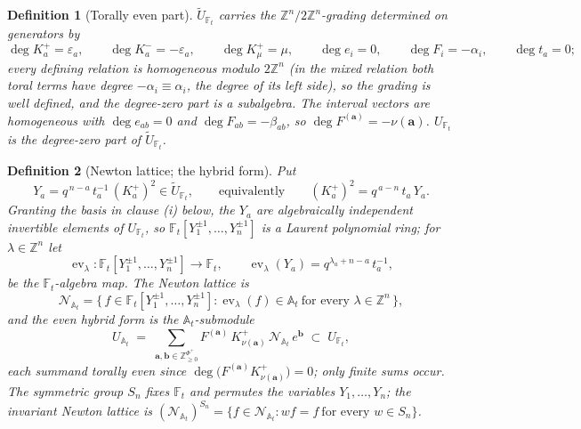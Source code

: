 \documentclass[11pt]{article}
\newtheorem{definition}{Definition}
\newcommand{\At}{\mathbb A_t}
\newcommand{\Ft}{\mathbb F_t}
\newcommand{\Nat}{\mathcal N_{\mathbb A_t}}
\newcommand{\ev}{\operatorname{ev}}
\begin{document}
\begin{definition}[Torally even part]\label{def:even}
$\widetilde U_{\Ft}$ carries the $\mathbb Z^{n}/2\mathbb Z^{n}$-grading
determined on generators by
\[
  \deg K_a^{+}=\varepsilon_a,\qquad
  \deg K_a^{-}=-\varepsilon_a,\qquad
  \deg K^{+}_{\mu}=\mu,\qquad
  \deg e_i=0,\qquad
  \deg F_i=-\alpha_i,\qquad
  \deg t_a=0;
\]
every defining relation is homogeneous modulo $2\mathbb Z^{n}$ (in the mixed
relation both toral terms have degree $-\alpha_i\equiv\alpha_i$, the degree
of its left side), so the grading is well defined, and the degree-zero part
is a subalgebra.  The interval vectors are homogeneous with
$\deg e_{ab}=0$ and $\deg F_{ab}=-\beta_{ab}$, so
$\deg F^{(\mathbf a)}=-\nu(\mathbf a)$.  $U_{\Ft}$ is the degree-zero part
of $\widetilde U_{\Ft}$.
\end{definition}

\begin{definition}[Newton lattice; the hybrid form]\label{def:newton}
Put
\[
  Y_a=q^{\,n-a}\,t_a^{-1}\,(K_a^{+})^{2}\in\widetilde U_{\Ft},
  \qquad\text{equivalently}\qquad
  (K_a^{+})^{2}=q^{\,a-n}\,t_a\,Y_a .
\]
Granting the basis in clause (i) below, the $Y_a$ are algebraically
independent invertible elements of $U_{\Ft}$, so
$\Ft[Y_1^{\pm1},\ldots,Y_n^{\pm1}]$ is a Laurent polynomial ring; for
$\lambda\in\mathbb Z^{n}$ let
\[
  \ev_\lambda:\Ft[Y_1^{\pm1},\ldots,Y_n^{\pm1}]\longrightarrow\Ft,
  \qquad
  \ev_\lambda(Y_a)=q^{\lambda_a+n-a}\,t_a^{-1},
\]
be the $\Ft$-algebra map.  The \emph{Newton lattice} is
\[
  \Nat=\bigl\{\,f\in\Ft[Y_1^{\pm1},\ldots,Y_n^{\pm1}]:
  \ev_\lambda(f)\in\At\ \text{for every }\lambda\in\mathbb Z^{n}\,\bigr\},
\]
and the \emph{even hybrid form} is the $\At$-submodule
\[
  U_{\At}\;=\;\sum_{\mathbf a,\mathbf b\in\mathbb Z_{\ge0}^{\Phi^{+}}}
  F^{(\mathbf a)}\,K^{+}_{\nu(\mathbf a)}\,\Nat\,e^{\mathbf b}
  \;\subset\;U_{\Ft},
\]
each summand torally even since
$\deg\bigl(F^{(\mathbf a)}K^{+}_{\nu(\mathbf a)}\bigr)=0$; only finite sums
occur.  The symmetric group $S_n$ fixes $\Ft$ and permutes the variables
$Y_1,\ldots,Y_n$; the invariant Newton lattice is
$(\Nat)^{S_n}=\{f\in\Nat: wf=f\ \text{for every }w\in S_n\}$.
\end{definition}
\end{document}
